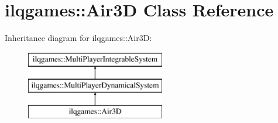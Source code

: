 \hypertarget{classilqgames_1_1_air3_d}{}\section{ilqgames\+:\+:Air3D Class Reference}
\label{classilqgames_1_1_air3_d}
Inheritance diagram for ilqgames\+:\+:Air3D\+:\begin{figure}[H]
\begin{center}
\leavevmode
\includegraphics[height=3.000000cm]{classilqgames_1_1_air3_d}
\end{center}
\end{figure}
